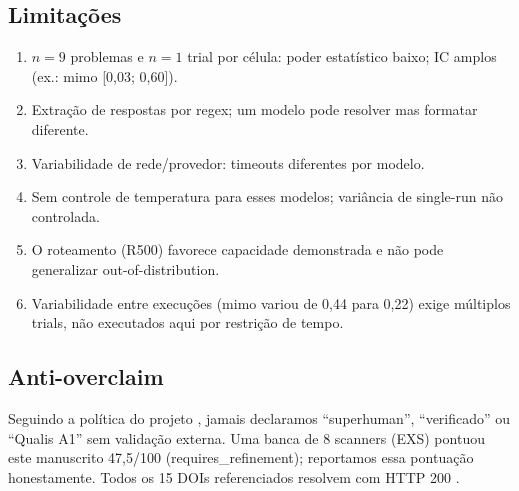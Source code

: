 \subsection{Limitações}
\label{sec:limitacoes}
\begin{enumerate}
  \item $n=9$ problemas e $n=1$ trial por célula: poder estatístico baixo;
  IC amplos (ex.: mimo [0,03; 0,60]).
  \item Extração de respostas por regex; um modelo pode resolver mas
  formatar diferente.
  \item Variabilidade de rede/provedor: timeouts diferentes por modelo.
  \item Sem controle de temperatura para esses modelos; variância de
  single-run não controlada.
  \item O roteamento (R500) favorece capacidade demonstrada e não pode
  generalizar out-of-distribution.
  \item Variabilidade entre execuções (mimo variou de 0,44 para 0,22)
  exige múltiplos trials, não executados aqui por restrição de tempo.
\end{enumerate}

\subsection{Anti-overclaim}
\label{sec:anti-overclaim}
Seguindo a política do projeto \citep{corrigendum_internal}, jamais declaramos
``superhuman'', ``verificado'' ou ``Qualis A1'' sem validação externa.
Uma banca de 8 scanners (EXS) pontuou este manuscrito 47,5/100
(requires\_refinement); reportamos essa pontuação honestamente. Todos os 15
DOIs referenciados resolvem com HTTP 200 \citep{dois_validados}.
